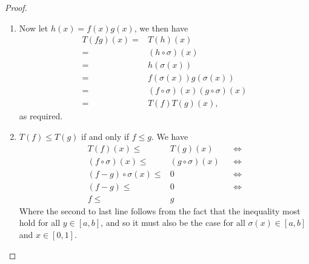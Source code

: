 \begin{proof}
\begin{enumerate}
    \item
    Now let $h(x) = f(x)g(x)$, we then have 
    \begin{align*}
        T(fg)(x)
        =& T(h)(x)\\
        =& (h\circ \sigma)(x)\\
        =& h(\sigma(x))\\
        =& f(\sigma(x))g(\sigma(x))\\
        =& (f\circ\sigma)(x)(g\circ\sigma)(x)\\
        =& T(f)T(g)(x),
    \end{align*}
    as required.
    
    \item $T(f) \leq T(g)$ if and only if $f\leq g$.
    We have
    \begin{align*}
        T(f)(x) \leq& T(g)(x) &&\iff\\
        (f \circ \sigma)(x) \leq& (g \circ \sigma)(x) &&\iff\\
        (f-g) \circ \sigma(x) \leq& 0 &&\iff\\
        (f-g) \leq& 0 &&\iff\\
        f \leq& g
    \end{align*}
    Where the second to last line follows from the fact that the inequality most hold for all $y\in[a,b]$, and so it must also be the case for all $\sigma(x)\in[a,b]$ and $x\in[0,1]$.
\end{enumerate}
\end{proof} 
